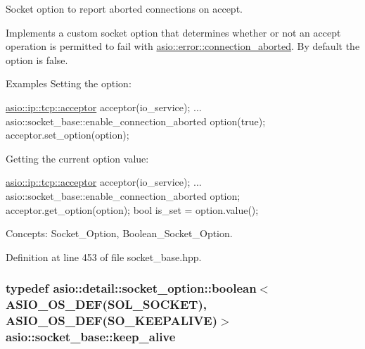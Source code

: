 Socket option to report aborted connections on accept. 

Implements a custom socket option that determines whether or not an accept operation is permitted to fail with \hyperlink{namespaceasio_1_1error_a2a69445eee784059ac2f4a6c4f5fe90da58e2f13d5e22e6a6381c7e96883b76e1}{asio\+::error\+::connection\+\_\+aborted}. By default the option is false.

\begin{DoxyParagraph}{Examples}
Setting the option\+: 
\begin{DoxyCode}
\hyperlink{classasio_1_1basic__socket__acceptor}{asio::ip::tcp::acceptor} acceptor(io\_service); 
...
asio::socket\_base::enable\_connection\_aborted option(\textcolor{keyword}{true});
acceptor.set\_option(option);
\end{DoxyCode}

\end{DoxyParagraph}
\begin{DoxyParagraph}{}
Getting the current option value\+: 
\begin{DoxyCode}
\hyperlink{classasio_1_1basic__socket__acceptor}{asio::ip::tcp::acceptor} acceptor(io\_service); 
...
asio::socket\_base::enable\_connection\_aborted option;
acceptor.get\_option(option);
\textcolor{keywordtype}{bool} is\_set = option.value();
\end{DoxyCode}

\end{DoxyParagraph}
\begin{DoxyParagraph}{Concepts\+:}
Socket\+\_\+\+Option, Boolean\+\_\+\+Socket\+\_\+\+Option. 
\end{DoxyParagraph}


Definition at line 453 of file socket\+\_\+base.\+hpp.

\hypertarget{classasio_1_1socket__base_a18672db1f78d0e0e58899e90100bf688}{}
\subsubsection[{keep\+\_\+alive}]{\setlength{\rightskip}{0pt plus 5cm}typedef {\bf asio\+::detail\+::socket\+\_\+option\+::boolean}$<$ {\bf A\+S\+I\+O\+\_\+\+O\+S\+\_\+\+D\+E\+F}(S\+O\+L\+\_\+\+S\+O\+C\+K\+E\+T), {\bf A\+S\+I\+O\+\_\+\+O\+S\+\_\+\+D\+E\+F}(S\+O\+\_\+\+K\+E\+E\+P\+A\+L\+I\+V\+E)$>$ {\bf asio\+::socket\+\_\+base\+::keep\+\_\+alive}}\label{classasio_1_1socket__base_a18672db1f78d0e0e58899e90100bf688}


